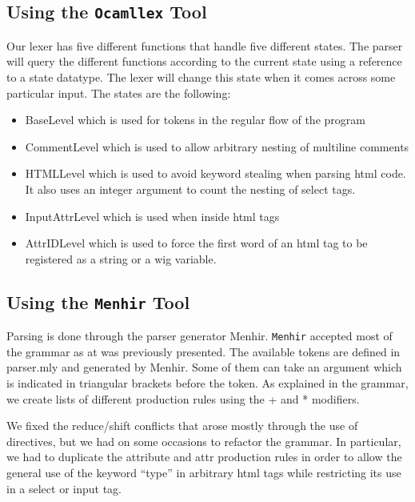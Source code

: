 \documentclass{WigReport}
\begin{document}
\subsection{Using the {\tt Ocamllex} Tool}
Our lexer has five different functions that handle five different states. The parser will query the different functions according to the current state using a reference to a state datatype. The lexer will change this state when it comes across some particular input. The states are the following:
\begin{itemize}
\item BaseLevel which is used for tokens in the regular flow of the program
\item CommentLevel which is used to allow arbitrary nesting of multiline comments
\item HTMLLevel which is used to avoid keyword stealing when parsing html code. It also uses an integer argument to count the nesting of select tags.
\item InputAttrLevel which is used when inside html tags
\item AttrIDLevel which is used to force the first word of an html tag to be registered as a string or a wig variable.
\end{itemize}

\subsection{Using the {\tt Menhir} Tool}
Parsing is done through the parser generator Menhir. {\tt Menhir} accepted most of the grammar as at was previously presented. The available tokens are defined in parser.mly and generated by Menhir. Some of them can take an argument which is indicated in triangular brackets before the token. As explained in the grammar, we create lists of different production rules using the + and * modifiers.

We fixed the reduce/shift conflicts that arose mostly through the use of directives, but we had on some occasions to refactor the grammar. In particular, we had to duplicate the attribute and attr production rules in order to allow the general use of the keyword ``type'' in arbitrary html tags while restricting its use in a select or input tag.
\end{document}
